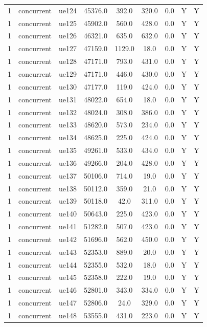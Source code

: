 \begin{table}[ht]
\begin{tabular}{|c|c|c|c|c|c|c|c|c|}
1 & concurrent & ue124 & 45376.0 & 392.0 & 320.0 & 0.0 & Y & Y \\
1 & concurrent & ue125 & 45902.0 & 560.0 & 428.0 & 0.0 & Y & Y \\
1 & concurrent & ue126 & 46321.0 & 635.0 & 632.0 & 0.0 & Y & Y \\
1 & concurrent & ue127 & 47159.0 & 1129.0 & 18.0 & 0.0 & Y & Y \\
1 & concurrent & ue128 & 47171.0 & 793.0 & 431.0 & 0.0 & Y & Y \\
1 & concurrent & ue129 & 47171.0 & 446.0 & 430.0 & 0.0 & Y & Y \\
1 & concurrent & ue130 & 47177.0 & 119.0 & 424.0 & 0.0 & Y & Y \\
1 & concurrent & ue131 & 48022.0 & 654.0 & 18.0 & 0.0 & Y & Y \\
1 & concurrent & ue132 & 48024.0 & 308.0 & 386.0 & 0.0 & Y & Y \\
1 & concurrent & ue133 & 48620.0 & 573.0 & 234.0 & 0.0 & Y & Y \\
1 & concurrent & ue134 & 48625.0 & 225.0 & 424.0 & 0.0 & Y & Y \\
1 & concurrent & ue135 & 49261.0 & 533.0 & 434.0 & 0.0 & Y & Y \\
1 & concurrent & ue136 & 49266.0 & 204.0 & 428.0 & 0.0 & Y & Y \\
1 & concurrent & ue137 & 50106.0 & 714.0 & 19.0 & 0.0 & Y & Y \\
1 & concurrent & ue138 & 50112.0 & 359.0 & 21.0 & 0.0 & Y & Y \\
1 & concurrent & ue139 & 50118.0 & 42.0 & 311.0 & 0.0 & Y & Y \\
1 & concurrent & ue140 & 50643.0 & 225.0 & 423.0 & 0.0 & Y & Y \\
1 & concurrent & ue141 & 51282.0 & 507.0 & 423.0 & 0.0 & Y & Y \\
1 & concurrent & ue142 & 51696.0 & 562.0 & 450.0 & 0.0 & Y & Y \\
1 & concurrent & ue143 & 52353.0 & 889.0 & 20.0 & 0.0 & Y & Y \\
1 & concurrent & ue144 & 52355.0 & 532.0 & 18.0 & 0.0 & Y & Y \\
1 & concurrent & ue145 & 52358.0 & 222.0 & 19.0 & 0.0 & Y & Y \\
1 & concurrent & ue146 & 52801.0 & 343.0 & 334.0 & 0.0 & Y & Y \\
1 & concurrent & ue147 & 52806.0 & 24.0 & 329.0 & 0.0 & Y & Y \\
1 & concurrent & ue148 & 53555.0 & 431.0 & 223.0 & 0.0 & Y & Y \\

\end{tabular}
\end{table}
